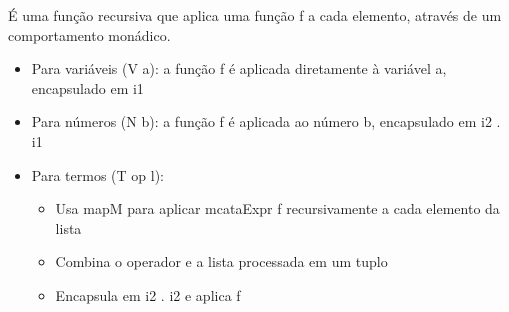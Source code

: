 \documentclass[11pt, a4paper, fleqn]{article}
\begin{document}
É uma função recursiva que aplica uma função f a cada elemento, através de um comportamento monádico.
\begin{itemize}
  \item Para variáveis (V a): a função f é aplicada diretamente à variável a, encapsulado em i1
  \item Para números (N b): a função f é aplicada ao número b, encapsulado em i2 . i1
  \item Para termos (T op l):
  \begin{itemize}
       \item Usa mapM para aplicar mcataExpr f recursivamente a cada elemento da lista
       \item Combina o operador e a lista processada em um tuplo
       \item Encapsula em i2 . i2 e aplica f
   \end{itemize}
\end{itemize}
\end{document}
